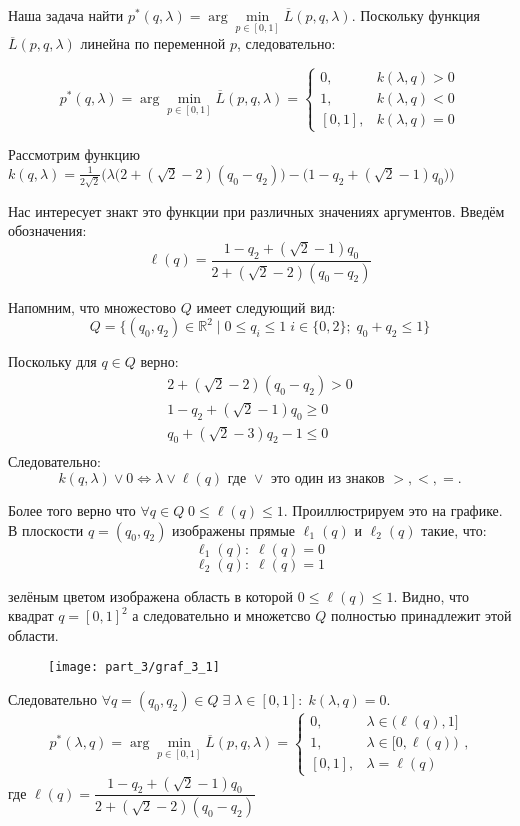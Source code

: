 \begin{flushleft}
	Наша задача найти 
	$p^*(q, \lambda)=\arg \min \limits_{p \in [0, 1]} \overline{L}(p,q,\lambda)$.
	Поскольку функция $\overline{L}(p,q,\lambda)$ линейна по переменной 
	$p$, следовательно:
	
	$$
		p^*(q, \lambda)=
		\arg \min \limits_{p \in [0, 1]} \overline{L}(p,q,\lambda)=
		\begin{cases}
			0, & k(\lambda,q)>0 \\
			1, & k(\lambda,q)<0 \\
			[0,1], & k(\lambda,q)=0
		\end{cases}	
	$$
	
	Рассмотрим функцию $k(q, \lambda)=\frac{1}{2\sqrt{2}}
	\Big(
		\lambda \big (2+(\sqrt{2}-2)(q_0-q_2) \big) -
		\big (1 - q_2 + (\sqrt{2} - 1)q_0 \big)
	\Big)
	$

	Нас интересует знакт это функции при различных значениях аргументов.
	Введём обозначения:
	$$\ell(q) = \frac{1 - q_2 + (\sqrt{2} - 1)q_0}{2+(\sqrt{2}-2)(q_0-q_2)}$$	
	
	Напомним, что множестово $Q$ имеет следующий вид:
	$$
		Q=\{(q_0,q_2) \in \mathbb{R}^2 \; | \;
		0 \leqslant q_i \leqslant 1 \; i\in\{0,2\}; \; 
		q_0 + q_2 \leqslant 1\}	
	$$	
	
	Поскольку для $q \in Q$ верно: 
	\begin{gather*}
	2+(\sqrt{2}-2)(q_0-q_2) > 0 \\
	1 - q_2 + (\sqrt{2} - 1)q_0 \geqslant 0 \\
	q_0 + (\sqrt{2} - 3) q_2 - 1 \leqslant 0 \\
	\end{gather*}
	Следовательно:
	$$
	k(q, \lambda) \vee 0 \Leftrightarrow 
	\lambda \vee \ell(q) \textrm{ где } \vee \textrm{ это один из знаков } >,<,=.
	$$
	
	Более того верно что 
	$\forall q \in Q \; 0 \leqslant \ell(q) \leqslant 1$. 
	Проиллюстрируем это на графике. В плоскости $q=(q_0,q_2)$ изображены 
	прямые $\ell_1(q)$ и $\ell_2(q)$ такие, что:
	$$\ell_1(q): \; \ell(q)=0 $$
	$$\ell_2(q): \; \ell(q)=1 $$
		
	зелёным цветом изображена область в которой
	$0 \leqslant \ell(q) \leqslant 1$.
	Видно, что квадрат $q = [0,1]^2$ а следовательно и
	множетсво $Q$ полностью принадлежит этой области.

	\begin{figure}[H]
		\centering
  		\texttt{[image: part\_3/graf\_3\_1]}
  		\caption{}
	\end{figure}
	
	Следовательно $\forall q=(q_0, q_2) \in Q \;
	\exists \; \lambda \in [0,1]: \; k(\lambda,q)=0$.
	$$
		p^*(\lambda,q)=
		\arg \min \limits_{p \in [0, 1]} \overline{L}(p,q,\lambda)=
		\begin{cases}
			0, & \lambda \in \big(\ell (q), 1\big] \\
			1, & \lambda \in \big[0, \ell(q) \big) \\
			[0,1], & \lambda=\ell(q)
		\end{cases},
	$$	
	где $\ell(q)=\dfrac{1 - q_2 + (\sqrt{2} - 1)q_0}{2+(\sqrt{2}-2)(q_0-q_2)}$

	
\end{flushleft}